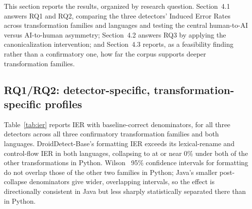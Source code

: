 \documentclass[sigconf,review,anonymous]{acmart}
\begin{document}
This section reports the results, organized by research question. Section~4.1 answers RQ1 and RQ2, comparing the three detectors' Induced Error Rates across transformation families and languages and testing the central human-to-AI versus AI-to-human asymmetry; Section~4.2 answers RQ3 by applying the canonicalization intervention; and Section~4.3 reports, as a feasibility finding rather than a confirmatory one, how far the corpus supports deeper transformation families.

\subsection{RQ1/RQ2: detector-specific, transformation-specific profiles}

Table~\ref{tab:ier} reports IER with baseline-correct denominators, for all three detectors across all three confirmatory transformation families and both languages. DroidDetect-Base's formatting IER exceeds its lexical-rename and control-flow IER in both languages, collapsing to at or near 0\% under both of the other transformations in Python. Wilson~\cite{wilson1927} 95\% confidence intervals for formatting do not overlap those of the other two families in Python; Java's smaller post-collapse denominators give wider, overlapping intervals, so the effect is directionally consistent in Java but less sharply statistically separated there than in Python.
\end{document}
